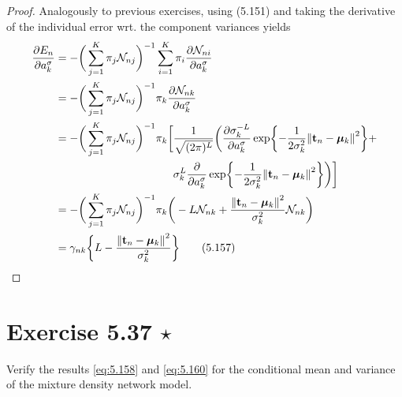 \begin{proof}
    Analogously to previous exercises, using (5.151) and 
    taking the derivative of the individual error wrt. the component
    variances yields
    \begin{align*}
        \pdv{E_n}{a_k^\sigma}
        &= -\bigg(\sum_{j=1}^{K} \pi_j \mathcal{N}_{nj}\bigg)^{-1}
            \sum_{i=1}^{K} \pi_i \pdv{\mathcal{N}_{ni}}{a_{k}^\sigma} \\
        &= -\bigg(\sum_{j=1}^{K} \pi_j \mathcal{N}_{nj}\bigg)^{-1}
            \pi_k \pdv{\mathcal{N}_{nk}}{a_{k}^\sigma} \\
        &= \begin{aligned}[t]
            -\bigg(\sum_{j=1}^{K} \pi_j \mathcal{N}_{nj}\bigg)^{-1}
            \pi_k\bigg[&\frac{1}{\sqrt{(2\pi)^L}} \bigg(\pdv{\sigma_k^{-L}}{a_k^\sigma}
            \exp{-\frac{1}{2\sigma_k^2} \norm{\mathbf{t}_n - \bm{\mu}_k}^2} + \\
                        & \sigma_k^{L} \pdv{a_k^\sigma} 
            \exp{-\frac{1}{2\sigma_k^2} \norm{\mathbf{t}_n - \bm{\mu}_k}^2}\bigg)\bigg] \\
        \end{aligned} \\
        &= -\bigg(\sum_{j=1}^{K} \pi_j \mathcal{N}_{nj}\bigg)^{-1}
            \pi_k\bigg(-L \mathcal{N}_{nk} 
            + \frac{\norm{\mathbf{t}_n - \bm{\mu}_k}^2}{\sigma_k^2} \mathcal{N}_{nk}\bigg) \\
        &= \gamma_{nk}\bigg\{L-
        \frac{\norm{\mathbf{t}_n - \bm{\mu}_k}^2}{\sigma_k^2}\bigg\}
        \tag{5.157}\label{eq:5.157}
    \end{align*}
\end{proof}

\section*{Exercise 5.37 $\star$}
Verify the results \eqref{eq:5.158} and \eqref{eq:5.160} for the conditional mean and 
variance of the mixture density network model.

\vspace{1em}

